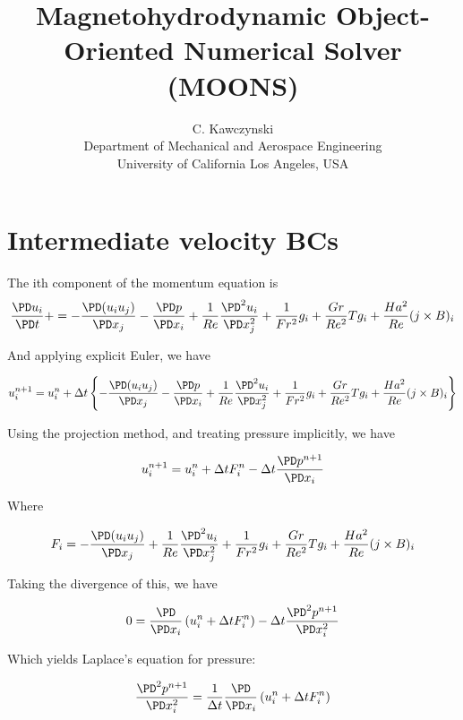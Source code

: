 \documentclass[11pt]{article}
\begin{document}
\doublespacing
\title{Magnetohydrodynamic Object-Oriented Numerical Solver (MOONS)}
\author{C. Kawczynski \\
Department of Mechanical and Aerospace Engineering \\
University of California Los Angeles, USA\\
}
\maketitle

\section{Intermediate velocity BCs}
The ith component of the momentum equation is
\begin{equation}
	\frac{\PD u_i}{\PD t} +
	=
	- \frac{\PD (u_i u_j)}{\PD x_j}
	- \frac{\PD p}{\PD x_i}
	+ \frac{1}{Re}
	\frac{\PD^2 u_i}{\PD x_j^2}
	+ \frac{1}{Fr^2}
	g_i
	+ \frac{Gr}{Re^2}
	T g_i
	+ \frac{Ha^2}{Re}
	(j \times B)_i
\end{equation}

And applying explicit Euler, we have

\begin{equation}
	u_i^{n+1}
	=
	u_i^n
	+
	\Delta t
	\left\{
	- \frac{\PD (u_i u_j)}{\PD x_j}
	- \frac{\PD p}{\PD x_i}
	+ \frac{1}{Re}
	\frac{\PD^2 u_i}{\PD x_j^2}
	+ \frac{1}{Fr^2}
	g_i
	+ \frac{Gr}{Re^2}
	T g_i
	+ \frac{Ha^2}{Re}
	(j \times B)_i
	\right\}
\end{equation}

Using the projection method, and treating pressure implicitly, we have

\begin{equation}
	u_i^{n+1}
	=
	u_i^n
	+
	\Delta t
	F_i^n
	-
	\Delta t
	\frac{\PD p^{n+1}}{\PD x_i}
\end{equation}

Where

\begin{equation}
	F_i
	=
	- \frac{\PD (u_i u_j)}{\PD x_j}
	+ \frac{1}{Re}
	\frac{\PD^2 u_i}{\PD x_j^2}
	+ \frac{1}{Fr^2}
	g_i
	+ \frac{Gr}{Re^2}
	T g_i
	+ \frac{Ha^2}{Re}
	(j \times B)_i
\end{equation}

Taking the divergence of this, we have

\begin{equation}
	0
	=
	\frac{\PD }{\PD x_i}
	\left(
	u_i^n
	+
	\Delta t
	F_i^n
	\right)
	-
	\Delta t
	\frac{\PD^2 p^{n+1}}{\PD x_i^2}
\end{equation}

Which yields Laplace's equation for pressure:

\begin{equation}
	\frac{\PD^2 p^{n+1}}{\PD x_i^2}
	=
	\frac{1}{\Delta t}
	\frac{\PD }{\PD x_i}
	\left(
	u_i^n
	+
	\Delta t
	F_i^n
	\right)
\end{equation}
\end{document}
